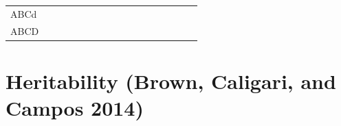 \documentclass[11pt,dvipsnames,ignorenonframetext,aspectratio=169]{beamer}
\begin{document}
\begin{frame}{}
\begin{table}
{\begin{tabular}{lllllllllllllllll}
ABCd & \cellcolor[HTML]{a8a035}{aAbBcCdd} & \cellcolor[HTML]{802acc}{aAbBcCdD} & \cellcolor[HTML]{802acc}{aAbBCCdd} & \cellcolor[HTML]{802acc}{aAbBCCdD} & \cellcolor[HTML]{802acc}{aABBcCdd} & \cellcolor[HTML]{802acc}{aABBcCdD} & \cellcolor[HTML]{802acc}{aABBCCdd} & \cellcolor[HTML]{802acc}{aABBCCdD} & \cellcolor[HTML]{802acc}{AAbBcCdd} & \cellcolor[HTML]{802acc}{AAbBcCdD} & \cellcolor[HTML]{802acc}{AAbBCCdd} & \cellcolor[HTML]{802acc}{AAbBCCdD} & \cellcolor[HTML]{802acc}{AABBcCdd} & \cellcolor[HTML]{802acc}{AABBcCdD} & \cellcolor[HTML]{802acc}{AABBCCdd} & \cellcolor[HTML]{802acc}{AABBCCdD}\\
ABCD & \cellcolor[HTML]{802acc}{aAbBcCdD} & \cellcolor[HTML]{802acc}{aAbBcCDD} & \cellcolor[HTML]{802acc}{aAbBCCdD} & \cellcolor[HTML]{802acc}{aAbBCCDD} & \cellcolor[HTML]{802acc}{aABBcCdD} & \cellcolor[HTML]{802acc}{aABBcCDD} & \cellcolor[HTML]{802acc}{aABBCCdD} & \cellcolor[HTML]{802acc}{aABBCCDD} & \cellcolor[HTML]{802acc}{AAbBcCdD} & \cellcolor[HTML]{802acc}{AAbBcCDD} & \cellcolor[HTML]{802acc}{AAbBCCdD} & \cellcolor[HTML]{802acc}{AAbBCCDD} & \cellcolor[HTML]{802acc}{AABBcCdD} & \cellcolor[HTML]{802acc}{AABBcCDD} & \cellcolor[HTML]{802acc}{AABBCCdD} & \cellcolor[HTML]{802acc}{AABBCCDD}\\
\bottomrule
\end{tabular}}
\endgroup{}
\end{table}

\renewcommand{\arraystretch}{1}
\end{frame}

\hypertarget{heritability-brown2014plantbreeding}{%
\section{Heritability (Brown, Caligari, and Campos
2014)}\label{heritability-brown2014plantbreeding}}
\end{document}
